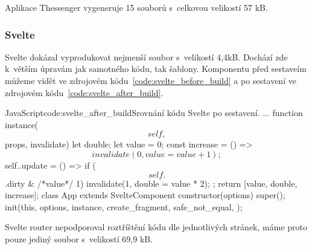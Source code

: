 \documentclass[
  master,
  program=ainf,
  printversion,
  tables=false,
  sourcecodes,
  glossaries,
  index
]{kidiplom}
\begin{document}
Aplikace Thessenger vygeneruje 15 souborů s~celkovou velikostí 57 kB.

\subsubsection{Svelte}
Svelte dokázal vyprodukovat nejmenší soubor s~velikostí 4,4kB. Dochází zde k~větším úpravám
jak samotného kódu, tak šablony. Komponentu před sestaveím můžeme vidět ve zdrojovém kódu~\ref{code:svelte_before_build} a po
sestavení ve zdrojovém kódu~\ref{code:svelte_after_build}. 


  \begin{kicode}{JavaScript}{code:svelte_after_build}{Srovnání kódu Svelte po sestavení.}
    ...
    function instance($$self, $$props, $$invalidate) {
      let double;
      let value = 0;
      const increase = () => $$invalidate(0, value = value + 1);
      $$self.$$.update = () => {
        if ($$self.$$.dirty & /*value*/
        1) { $$invalidate(1, double = value * 2); }
      };
      return [value, double, increase];
    }
    class App extends SvelteComponent {
      constructor(options) {
        super();
        init(this, options, instance, create_fragment, safe_not_equal, {});
      }
    }
\end{kicode}

Svelte router nepodporoval roztříštění kódu dle jednotlivých stránek, máme proto pouze jediný soubor
s~velikostí 69,9 kB.
\end{document}
